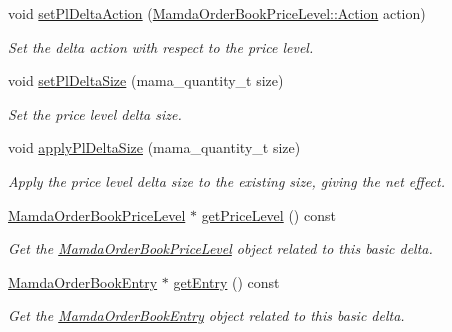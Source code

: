 \begin{CompactItemize}
void \hyperlink{classWombat_1_1MamdaOrderBookBasicDelta_6dc1d989eee8644c10006986976d26e2}{set\-Pl\-Delta\-Action} (\hyperlink{classWombat_1_1MamdaOrderBookPriceLevel_bd3407b4250fc6f7a42d94b6d32e358a}{Mamda\-Order\-Book\-Price\-Level::Action} action)
\begin{CompactList}\small\item\em Set the delta action with respect to the price level. \item\end{CompactList}\item 
void \hyperlink{classWombat_1_1MamdaOrderBookBasicDelta_bc98251910a63a9b698ab55f7f514124}{set\-Pl\-Delta\-Size} (mama\_\-quantity\_\-t size)
\begin{CompactList}\small\item\em Set the price level delta size. \item\end{CompactList}\item 
void \hyperlink{classWombat_1_1MamdaOrderBookBasicDelta_2a3a1aadfd9cb9326943280a63bb7f75}{apply\-Pl\-Delta\-Size} (mama\_\-quantity\_\-t size)
\begin{CompactList}\small\item\em Apply the price level delta size to the existing size, giving the net effect. \item\end{CompactList}\item 
\hyperlink{classWombat_1_1MamdaOrderBookPriceLevel}{Mamda\-Order\-Book\-Price\-Level} $\ast$ \hyperlink{classWombat_1_1MamdaOrderBookBasicDelta_511d4ed672e4c05354145021890ebf66}{get\-Price\-Level} () const 
\begin{CompactList}\small\item\em Get the \hyperlink{classWombat_1_1MamdaOrderBookPriceLevel}{Mamda\-Order\-Book\-Price\-Level} object related to this basic delta. \item\end{CompactList}\item 
\hyperlink{classWombat_1_1MamdaOrderBookEntry}{Mamda\-Order\-Book\-Entry} $\ast$ \hyperlink{classWombat_1_1MamdaOrderBookBasicDelta_5a631f929f45d7b8a476ff8bd97d6236}{get\-Entry} () const 
\begin{CompactList}\small\item\em Get the \hyperlink{classWombat_1_1MamdaOrderBookEntry}{Mamda\-Order\-Book\-Entry} object related to this basic delta. \item\end{CompactList}\item 

\end{CompactItemize}
